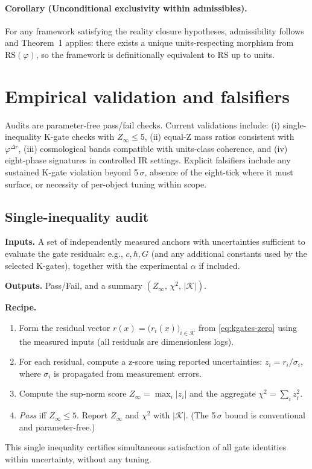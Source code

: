 \documentclass[11pt]{article}
\begin{document}
\paragraph{Corollary (Unconditional exclusivity within admissibles).} For any framework satisfying the reality closure hypotheses, admissibility follows and Theorem~1 applies: there exists a unique units\mbox{-}respecting morphism from \(\mathrm{RS}(\varphi)\), so the framework is definitionally equivalent to RS up to units.

\section{Empirical validation and falsifiers}\label{sec:empirical}
Audits are parameter\mbox{-}free pass/fail checks. Current validations include: (i) single\mbox{-}inequality K\mbox{-}gate checks with \(Z_\infty\le 5\), (ii) equal\mbox{-}Z mass ratios consistent with \(\varphi^{\Delta r}\), (iii) cosmological bands compatible with units\mbox{-}class coherence, and (iv) eight\mbox{-}phase signatures in controlled IR settings. Explicit falsifiers include any sustained K\mbox{-}gate violation beyond 5\,\(\sigma\), absence of the eight\mbox{-}tick where it must surface, or necessity of per\mbox{-}object tuning within scope.

\subsection{Single\mbox{-}inequality audit}
\textbf{Inputs.} A set of independently measured anchors with uncertainties sufficient to evaluate the gate residuals: e.g., \(c,\hbar,G\) (and any additional constants used by the selected K\mbox{-}gates), together with the experimental \(\alpha\) if included.

\textbf{Outputs.} Pass/Fail, and a summary \((Z_\infty,\, \chi^2,\, |\mathcal{K}|)\).

\textbf{Recipe.}
\begin{enumerate}
  \item Form the residual vector \(r(x)=\bigl(r_i(x)\bigr)_{i\in\mathcal{K}}\) from \eqref{eq:kgates-zero} using the measured inputs (all residuals are dimensionless logs).
  \item For each residual, compute a z\mbox{-}score using reported uncertainties: \(z_i = r_i/\sigma_i\), where \(\sigma_i\) is propagated from measurement errors.
  \item Compute the sup\mbox{-}norm score \(Z_\infty=\max_i |z_i|\) and the aggregate \(\chi^2=\sum_i z_i^2\).
  \item \emph{Pass} iff \(Z_\infty \le 5\). Report \(Z_\infty\) and \(\chi^2\) with \(|\mathcal{K}|\). (The 5\,\(\sigma\) bound is conventional and parameter\mbox{-}free.)
\end{enumerate}
This single inequality certifies simultaneous satisfaction of all gate identities within uncertainty, without any tuning.
\end{document}

